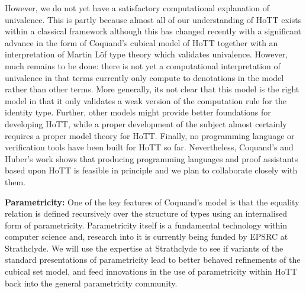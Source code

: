 \documentclass[a4paper,11pt]{article}
\begin{document}

However, we do not yet have a satisfactory computational explanation of
univalence. This is partly because almost all of our understanding of
HoTT exists within a classical framework although this has changed
recently with a significant advance in the form of Coquand's cubical
model of HoTT together with an interpretation of Martin L\"of type
theory which validates univalence. However, much remains to be done:
there is not yet a computational interpretation of univalence in that
terms currently only compute to denotations in the model rather than
other terms. More generally, its not clear that this model is the
right model in that it only validates a weak version of the
computation rule for the identity type. Further, other models might
provide better foundations for developing HoTT, while a proper
development of the subject almost certainly requires a proper model
theory for HoTT. Finally, no programming language or verification tools
have been built for HoTT so far. Nevertheless, Coquand's and Huber's
work shows that producing programming languages and proof assistants
based upon HoTT is feasible in principle and we plan to
collaborate closely with them.

{\bf Parametricity:} One of the key features of Coquand's model is that
the equality relation is defined recursively over the structure of
types using an internalised form of parametricity. Parametricity
itself is a fundamental technology within computer science and,
research into it is currently being funded by EPSRC at Strathclyde. We
will use the expertise at Strathclyde to see if variants of the
standard presentations of parametricity lead to better behaved
refinements of the cubical set model, and feed innovations in the use
of parametricity within HoTT back into the general parametricity
community.
\end{document}
